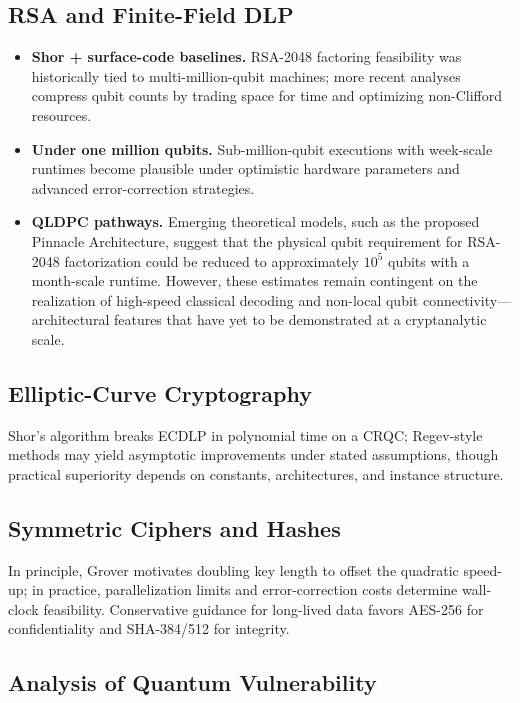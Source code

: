 \documentclass[11pt,a4paper]{article}
\begin{document}
\subsection{RSA and Finite-Field DLP}
\begin{itemize}[leftmargin=*]
  \item \textbf{Shor + surface-code baselines.} RSA-2048 factoring feasibility was historically tied to multi-million-qubit machines; more recent analyses compress qubit counts by trading space for time and optimizing non-Clifford resources.\cite{gidney2025}
  \item \textbf{Under one million qubits.} Sub-million-qubit executions with week-scale runtimes become plausible under optimistic hardware parameters and advanced error-correction strategies.\cite{gidney2025}
  \item \textbf{QLDPC pathways.} Emerging theoretical models, such as the proposed Pinnacle Architecture, suggest that the physical qubit requirement for RSA-2048 factorization could be reduced to approximately $10^5$ qubits with a month-scale runtime. However, these estimates remain contingent on the realization of high-speed classical decoding and non-local qubit connectivity—architectural features that have yet to be demonstrated at a cryptanalytic scale.\cite{webster2026}
\end{itemize}

\subsection{Elliptic-Curve Cryptography}
Shor's algorithm breaks ECDLP in polynomial time on a CRQC; Regev-style methods may yield asymptotic improvements under stated assumptions, though practical superiority depends on constants, architectures, and instance structure.\cite{shor1997,regev2024,barbulescu2025}

\subsection{Symmetric Ciphers and Hashes}
In principle, Grover motivates doubling key length to offset the quadratic speed-up; in practice, parallelization limits and error-correction costs determine wall-clock feasibility. Conservative guidance for long-lived data favors AES-256 for confidentiality and SHA-384/512 for integrity.\cite{grovercost,sp80057}

\subsection{Analysis of Quantum Vulnerability}
\label{subsec:analysis}
\end{document}
